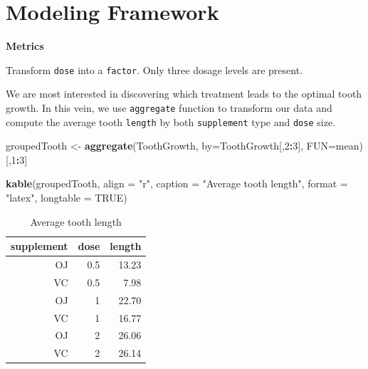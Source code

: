 \documentclass[12pt,oneside]{chicagocapstone}
\newenvironment{Shaded}{\begin{snugshade}}{\end{snugshade}}
\newcommand{\KeywordTok}[1]{\textcolor[rgb]{0.13,0.29,0.53}{\textbf{#1}}}
\newcommand{\DataTypeTok}[1]{\textcolor[rgb]{0.13,0.29,0.53}{#1}}
\newcommand{\DecValTok}[1]{\textcolor[rgb]{0.00,0.00,0.81}{#1}}
\newcommand{\StringTok}[1]{\textcolor[rgb]{0.31,0.60,0.02}{#1}}
\newcommand{\OtherTok}[1]{\textcolor[rgb]{0.56,0.35,0.01}{#1}}
\newcommand{\OperatorTok}[1]{\textcolor[rgb]{0.81,0.36,0.00}{\textbf{#1}}}
\newcommand{\NormalTok}[1]{#1}
\begin{document}
\section*{Modeling Framework}\label{methodology-modeling}

\textbf{Metrics}

Transform \texttt{dose} into a \texttt{factor}. Only three dosage levels
are present.
\begin{Shaded}
\end{Shaded}
We are most interested in discovering which treatment leads to the
optimal tooth growth. In this vein, we use \texttt{aggregate} function
to transform our data and compute the average tooth \texttt{length} by
both \texttt{supplement} type and \texttt{dose} size.
\begin{Shaded}
\begin{Highlighting}[]
\NormalTok{groupedTooth <-}\StringTok{ }\KeywordTok{aggregate}\NormalTok{(ToothGrowth, }\DataTypeTok{by=}\NormalTok{ToothGrowth[,}\DecValTok{2}\OperatorTok{:}\DecValTok{3}\NormalTok{], }\DataTypeTok{FUN=}\NormalTok{mean)[,}\DecValTok{1}\OperatorTok{:}\DecValTok{3}\NormalTok{]}

\KeywordTok{kable}\NormalTok{(groupedTooth, }\DataTypeTok{align =} \StringTok{"r"}\NormalTok{, }\DataTypeTok{caption =} \StringTok{"Average tooth length"}\NormalTok{,}
      \DataTypeTok{format =} \StringTok{"latex"}\NormalTok{, }\DataTypeTok{longtable =} \OtherTok{TRUE}\NormalTok{)}
\end{Highlighting}
\end{Shaded}
\begin{longtable}{r|r|r}
\caption{\label{tab:group}Average tooth length}\\
\hline
supplement & dose & length\\
\hline
OJ & 0.5 & 13.23\\
\hline
VC & 0.5 & 7.98\\
\hline
OJ & 1 & 22.70\\
\hline
VC & 1 & 16.77\\
\hline
OJ & 2 & 26.06\\
\hline
VC & 2 & 26.14\\
\hline
\end{longtable}
\newpage
\end{document}
